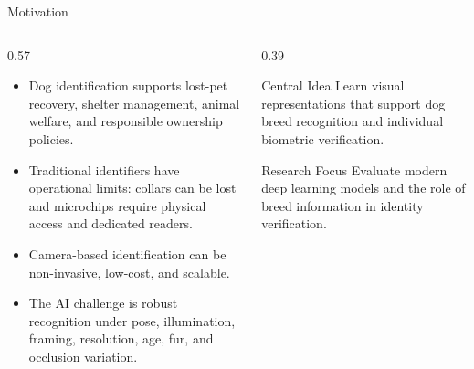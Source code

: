 \documentclass[aspectratio=169,11pt]{beamer}
\begin{document}
\begin{frame}{Motivation}
  \begin{columns}[T,onlytextwidth]
    \begin{column}{0.57\textwidth}
      \begin{itemize}
        \item Dog identification supports lost-pet recovery, shelter management, animal welfare, and responsible ownership policies.
        \item Traditional identifiers have operational limits: collars can be lost and microchips require physical access and dedicated readers.
        \item Camera-based identification can be non-invasive, low-cost, and scalable.
        \item The AI challenge is robust recognition under pose, illumination, framing, resolution, age, fur, and occlusion variation.
      \end{itemize}
    \end{column}
    \begin{column}{0.39\textwidth}
      \begin{alertblock}{Central Idea}
        Learn visual representations that support dog breed recognition and individual biometric verification.
      \end{alertblock}
      \begin{block}{Research Focus}
        Evaluate modern deep learning models and the role of breed information in identity verification.
      \end{block}
    \end{column}
  \end{columns}
\end{frame}
\end{document}

